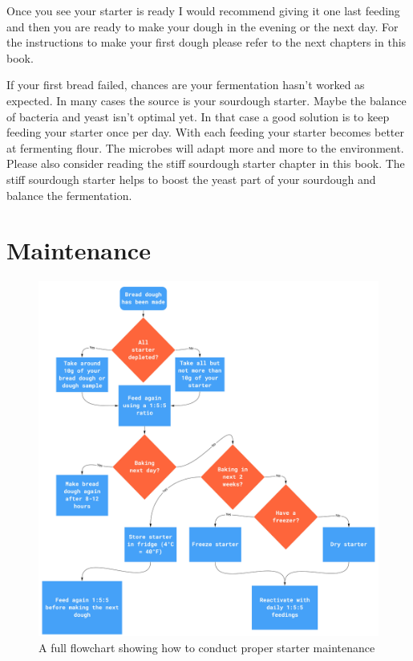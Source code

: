 Once you see your starter is ready I would recommend giving it
one last feeding and then you are ready to make your dough in the
evening or the next day. For the instructions to make your
first dough please refer to the next chapters in this book.

If your first bread failed, chances are your fermentation hasn't
worked as expected. In many cases the source is your sourdough starter. Maybe
the balance of bacteria and yeast isn't optimal yet. In that case a good
solution is to keep feeding your starter once per day. With each feeding your
starter becomes better at fermenting flour. The microbes will adapt more and
more to the environment. Please also consider reading the stiff sourdough starter
chapter in this book. The stiff sourdough starter helps to boost the
yeast part of your sourdough and balance the fermentation.

\section{Maintenance}

\begin{figure}[!htb]
  \includegraphics[width=\textwidth]{sourdough-starter-maintenance-process.jpg}
  \caption{A full flowchart showing how to conduct proper starter maintenance}
  \label{fig:sourdough-maintenance-process}
\end{figure}

